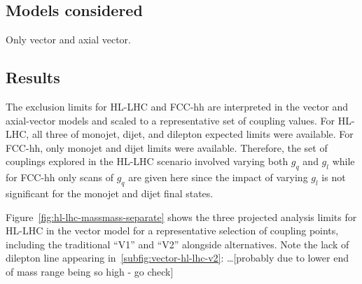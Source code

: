 \documentclass[11pt]{article}
\begin{document}
\subsection{Models considered}

Only vector and axial vector.

\subsection{Results}

The exclusion limits for HL-LHC and FCC-hh are interpreted in the vector and axial-vector models and scaled to a representative set of coupling values. For HL-LHC, all three of monojet, dijet, and dilepton expected limits were available. For FCC-hh, only monojet and dijet limits were available. Therefore, the set of couplings explored in the HL-LHC scenario involved varying both $g_q$ and $g_l$ while for FCC-hh only scans of $g_q$ are given here since the impact of varying $g_l$ is not significant for the monojet and dijet final states.

Figure~\ref{fig:hl-lhc-massmass-separate} shows the three projected analysis limits for HL-LHC in the vector model for a representative selection of coupling points, including the traditional ``V1'' and ``V2'' alongside alternatives.  Note the lack of dilepton line appearing in~\ref{subfig:vector-hl-lhc-v2}: \ldots [probably due to lower end of mass range being so high - go check]
\end{document}
